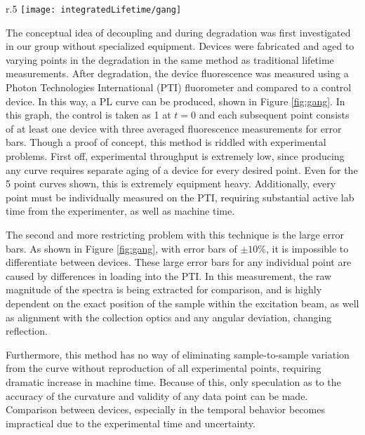 \documentclass[../thesis.tex]{subfiles}
\begin{document}
\begin{wrapfigure}{r}{.5\textwidth}
\centering
\texttt{[image: integratedLifetime/gang]}
\caption{Initial Attempts at measuring \pl during degradation using individual devices from the PTI.}
\label{fig:gang}
\end{wrapfigure}

The conceptual idea of decoupling \ef and \pl during degradation was first investigated in our group without specialized equipment.
Devices were fabricated and aged to varying points in the degradation in the same method as traditional lifetime measurements.
After degradation, the device fluorescence was measured using a Photon Technologies International (PTI) fluorometer and compared to a control device.
In this way, a PL curve can be produced, shown in Figure \ref{fig:gang}.
In this graph, the control is taken as 1 at $t=0$ and each subsequent point consists of at least one device with three averaged fluorescence measurements for error bars.
Though a proof of concept, this method is riddled with experimental problems.
First off, experimental throughput is extremely low, since producing any \pl curve requires separate aging of a device for every desired point.  
Even for the 5 point curves shown, this is extremely equipment heavy.
Additionally, every point must be individually measured on the PTI, requiring substantial active lab time from the experimenter, as well as machine time.

The second and more restricting problem with this technique is the large error bars.  
As shown in Figure \ref{fig:gang}, with error bars of $\pm 10\%$, it is impossible to differentiate between devices.
These large error bars for any individual point are caused by differences in loading into the PTI.  
In this measurement, the raw magnitude of the spectra is being extracted for comparison, and is highly dependent on the exact position of the sample within the excitation beam, as well as alignment with the collection optics and any angular deviation, changing reflection.

Furthermore, this method has no way of eliminating sample-to-sample variation from the \pl curve without reproduction of all experimental points, requiring dramatic increase in machine time.
Because of this, only speculation as to the accuracy of the curvature and validity of any data point can be made.
Comparison between devices, especially in the temporal behavior becomes impractical due to the experimental time and uncertainty.
\end{document}
